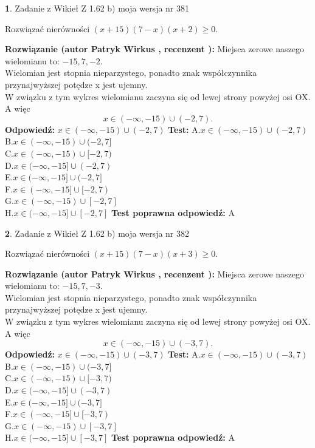 \documentclass[12pt, a4paper]{article}
\theoremstyle{definition} %
\newtheorem{zad}{}
\newcommand{\zadStart}[1]{\begin{zad}#1\newline}
\newcommand{\zadStop}{\end{zad}}
\newcommand{\rozwStart}[2]{\noindent \textbf{Rozwiązanie (autor #1 , recenzent #2): }\newline}
\newcommand{\rozwStop}{\newline}
\newcommand{\odpStart}{\noindent \textbf{Odpowiedź:}\newline}
\newcommand{\odpStop}{\newline}
\newcommand{\testStart}{\noindent \textbf{Test:}\newline}
\newcommand{\testStop}{\newline}
\newcommand{\kluczStart}{\noindent \textbf{Test poprawna odpowiedź:}\newline}
\newcommand{\kluczStop}{\newline}
\begin{document}
\zadStart{Zadanie z Wikieł Z 1.62 b) moja wersja nr 381}

Rozwiązać nierówności $(x+15)(7-x)(x+2)\ge0$.
\zadStop
\rozwStart{Patryk Wirkus}{}
Miejsca zerowe naszego wielomianu to: $-15, 7, -2$.\\
Wielomian jest stopnia nieparzystego, ponadto znak współczynnika przy\linebreak najwyższej potędze x jest ujemny.\\ W związku z tym wykres wielomianu zaczyna się od lewej strony powyżej osi OX. A więc $$x \in (-\infty,-15) \cup (-2,7).$$
\rozwStop
\odpStart
$x \in (-\infty,-15) \cup (-2,7)$
\odpStop
\testStart
A.$x \in (-\infty,-15) \cup (-2,7)$\\
B.$x \in (-\infty,-15) \cup (-2,7]$\\
C.$x \in (-\infty,-15) \cup [-2,7)$\\
D.$x \in (-\infty,-15] \cup (-2,7)$\\
E.$x \in (-\infty,-15] \cup (-2,7]$\\
F.$x \in (-\infty,-15] \cup [-2,7)$\\
G.$x \in (-\infty,-15) \cup [-2,7]$\\
H.$x \in (-\infty,-15] \cup [-2,7]$
\testStop
\kluczStart
A
\kluczStop



\zadStart{Zadanie z Wikieł Z 1.62 b) moja wersja nr 382}

Rozwiązać nierówności $(x+15)(7-x)(x+3)\ge0$.
\zadStop
\rozwStart{Patryk Wirkus}{}
Miejsca zerowe naszego wielomianu to: $-15, 7, -3$.\\
Wielomian jest stopnia nieparzystego, ponadto znak współczynnika przy\linebreak najwyższej potędze x jest ujemny.\\ W związku z tym wykres wielomianu zaczyna się od lewej strony powyżej osi OX. A więc $$x \in (-\infty,-15) \cup (-3,7).$$
\rozwStop
\odpStart
$x \in (-\infty,-15) \cup (-3,7)$
\odpStop
\testStart
A.$x \in (-\infty,-15) \cup (-3,7)$\\
B.$x \in (-\infty,-15) \cup (-3,7]$\\
C.$x \in (-\infty,-15) \cup [-3,7)$\\
D.$x \in (-\infty,-15] \cup (-3,7)$\\
E.$x \in (-\infty,-15] \cup (-3,7]$\\
F.$x \in (-\infty,-15] \cup [-3,7)$\\
G.$x \in (-\infty,-15) \cup [-3,7]$\\
H.$x \in (-\infty,-15] \cup [-3,7]$
\testStop
\kluczStart
A
\kluczStop
\end{document}
